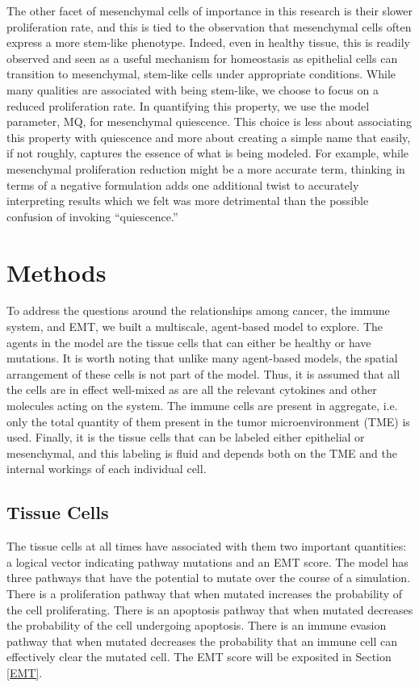 \documentclass{article}
\begin{document}
The other facet of mesenchymal cells of importance in this research is their slower proliferation rate, and this is tied to the observation that mesenchymal cells often express a more stem-like phenotype.
Indeed, even in healthy tissue, this is readily observed and seen as a useful mechanism for homeostasis as epithelial cells can transition to mesenchymal, stem-like cells under appropriate conditions.
While many qualities are associated with being stem-like, we choose to focus on a reduced proliferation rate.
In quantifying this property, we use the model parameter, MQ, for mesenchymal quiescence.
This choice is less about associating this property with quiescence and more about creating a simple name that easily, if not roughly, captures the essence of what is being modeled.
For example, while mesenchymal proliferation reduction might be a more accurate term, thinking in terms of a negative formulation adds one additional twist to accurately interpreting results which we felt was more detrimental than the possible confusion of invoking ``quiescence.''



\section{Methods}
To address the questions around the relationships among cancer, the immune system, and EMT, we built a multiscale, agent-based model to explore.
The agents in the model are the tissue cells that can either be healthy or have mutations.
It is worth noting that unlike many agent-based models, the spatial arrangement of these cells is not part of the model.
Thus, it is assumed that all the cells are in effect well-mixed as are all the relevant cytokines and other molecules acting on the system.
The immune cells are present in aggregate, i.e. only the total quantity of them present in the tumor microenvironment (TME) is used.
Finally, it is the tissue cells that can be labeled either epithelial or mesenchymal, and this labeling is fluid and depends both on the TME and the internal workings of each individual cell.

\subsection{Tissue Cells}\label{TissueCells}
The tissue cells at all times have associated with them two important quantities: a logical vector indicating pathway mutations and an EMT score.
The model has three pathways that have the potential to mutate over the course of a simulation.
There is a proliferation pathway that when mutated increases the probability of the cell proliferating.
There is an apoptosis pathway that when mutated decreases the probability of the cell undergoing apoptosis.
There is an immune evasion pathway that when mutated decreases the probability that an immune cell can effectively clear the mutated cell.
The EMT score will be exposited in Section \ref{EMT}.
\end{document}
